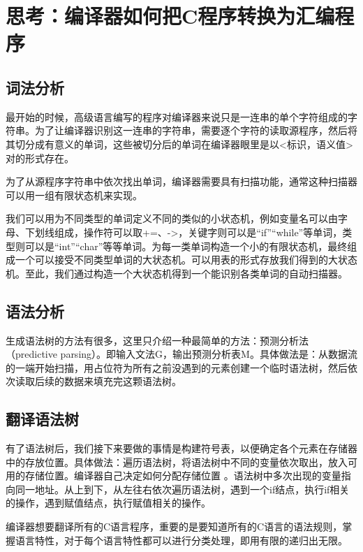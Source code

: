 \documentclass[lang=cn,11pt]{elegantpaper}
\begin{document}
\section{思考：编译器如何把C程序转换为汇编程序}

\subsection{词法分析}
最开始的时候，高级语言编写的程序对编译器来说只是一连串的单个字符组成的字符串。为了让编译器识别这一连串的字符串，需要逐个字符的读取源程序，然后将其切分成有意义的单词，这些被切分后的单词在编译器眼里是以<标识，语义值>对的形式存在。
\par 为了从源程序字符串中依次找出单词，编译器需要具有扫描功能，通常这种扫描器可以用一组有限状态机来实现。
\par 我们可以用为不同类型的单词定义不同的类似的小状态机，例如变量名可以由字母、下划线组成，操作符可以取+=、->，关键字则可以是“if”“while”等单词，类型则可以是“int”“char”等等单词。为每一类单词构造一个小的有限状态机，最终组成一个可以接受不同类型单词的大状态机。可以用表的形式存放我们得到的大状态机。至此，我们通过构造一个大状态机得到一个能识别各类单词的自动扫描器。

\subsection{语法分析}
生成语法树的方法有很多，这里只介绍一种最简单的方法：预测分析法（predictive parsing）。即输入文法G，输出预测分析表M。具体做法是：从数据流的一端开始扫描，用占位符为所有之前没遇到的元素创建一个临时语法树，然后依次读取后续的数据来填充完这颗语法树。

\subsection{翻译语法树}
有了语法树后，我们接下来要做的事情是构建符号表，以便确定各个元素在存储器中的存放位置。具体做法：遍历语法树，将语法树中不同的变量依次取出，放入可用的存储位置。编译器自己决定如何分配存储位置 。语法树中多次出现的变量指向同一地址。从上到下，从左往右依次遍历语法树，遇到一个if结点，执行if相关的操作，遇到赋值结点，执行赋值相关的操作。
\par 编译器想要翻译所有的C语言程序，重要的是要知道所有的C语言的语法规则，掌握语言特性，对于每个语言特性都可以进行分类处理，即用有限的递归出无限。



\nocite{*}


\end{document}
